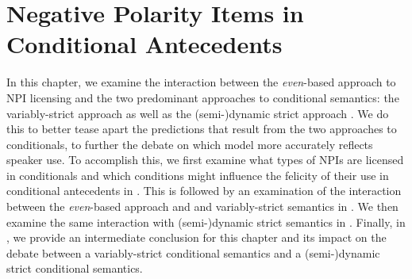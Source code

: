 \chapter{Negative Polarity Items in Conditional Antecedents}
In this chapter, we examine the interaction between the \textit{even}-based approach to NPI licensing and the two predominant approaches to conditional semantics: the variably-strict approach \parencite{Stalnaker1968,Lewis1973} as well as the (semi-)dynamic strict approach \parencite{Fintel2001,Gillies2007}. We do this to better tease apart the predictions that result from the two approaches to conditionals, to further the debate on which model more accurately reflects speaker use. To accomplish this, we first examine what types of NPIs are licensed in conditionals and which conditions might influence the felicity of their use in conditional antecedents in . This is followed by an examination of the interaction between the \textit{even}-based approach and \textcite{Stalnaker1968} and  variably-strict semantics in . We then examine the same interaction with  (semi-)dynamic strict semantics in . Finally, in , we provide an intermediate conclusion for this chapter and its impact on  the debate between a variably-strict conditional semantics and a (semi-)dynamic strict conditional semantics.

